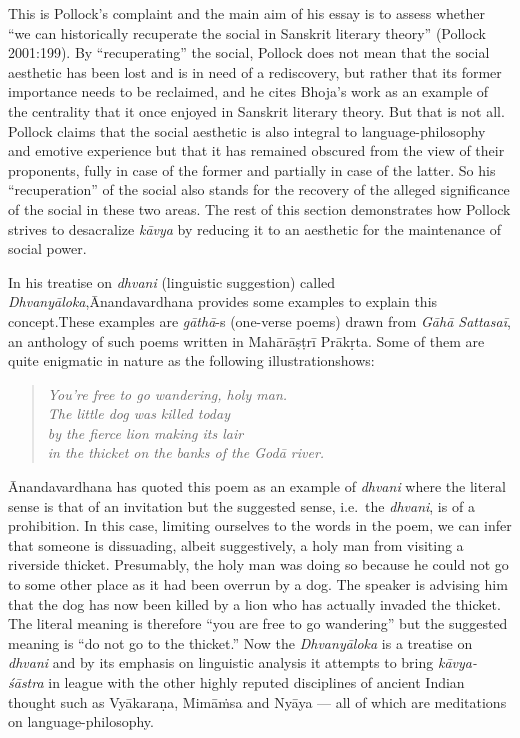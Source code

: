 This is Pollock's complaint and the main aim of his essay is to assess whether ``we can historically recuperate the social in Sanskrit literary theory'' (Pollock 2001:199). By ``recuperating'' the social, Pollock does not mean that the social aesthetic has been lost and is in need of a rediscovery, but rather that its former importance needs to be reclaimed, and he cites Bhoja's work as an example of the centrality that it once enjoyed in Sanskrit literary theory. But that is not all. Pollock claims that the social aesthetic is also integral to language-philosophy and emotive experience but that it has remained obscured from the view of their proponents, fully in case of the former and partially in case of the latter. So his ``recuperation'' of the social also stands for the recovery of the alleged significance of the social in these two areas. The rest of this section demonstrates how Pollock strives to desacralize \textsl{kāvya} by reducing it to an aesthetic for the maintenance of social power.

In his treatise on \textsl{dhvani} (linguistic suggestion) called \textsl{Dhvanyāloka},\break Ānandavardhana provides some examples to explain this concept.\break These examples are \textsl{gāthā}-s (one-verse poems) drawn from \textsl{Gāhā Sattasaī}, an anthology of such poems written in Mahārāṣṭrī Prākṛta. Some of them are quite enigmatic in nature as the following illustration\break shows:
\begin{quote}
\textsl{You’re free to go wandering, holy man.}\\
\textsl{The little dog was killed today}\\
\textsl{by the fierce lion making its lair}\\
\textsl{in the thicket on the banks of the Godā river.}
\end{quote}
\newpage

Ānandavardhana has quoted this poem as an example of \textsl{dhvani} where the literal sense is that of an invitation but the suggested sense, i.e.\ the \textsl{dhvani}, is of a prohibition. In this case, limiting ourselves to the words in the poem, we can infer that someone is dissuading, albeit suggestively, a holy man from visiting a riverside thicket. Presumably, the holy man was doing so because he could not go to some other place as it had been overrun by a dog. The speaker is advising him that the dog has now been killed by a lion who has actually invaded the thicket. The literal meaning is therefore ``you are free to go wandering'' but the suggested meaning is ``do not go to the thicket.'' Now the \textsl{Dhvanyāloka} is a treatise on \textsl{dhvani} and by its emphasis on linguistic analysis it attempts to bring \textsl{kāvya-śāstra} in league with the other highly reputed disciplines of ancient Indian thought such as Vyākaraṇa, Mimāṁsa and Nyāya --- all of which are meditations on language-philosophy.


